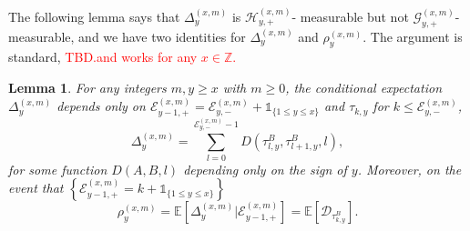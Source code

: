 \documentclass[twoside,12pt,a4paper]{article}
\newtheorem{lemma}{Lemma}[section]
\numberwithin{equation}{section}
\newcommand\TBD{\textcolor{red}{TBD.}}
\newcommand{\edt}[1]{\textcolor{red}{#1}} %
\begin{document}
	The following lemma says that $\Delta^{(x,m)}_{y}$ is $\mathcal{H}_{y, +}^{(x,m)}$- measurable but not $\mathcal{G}_{y, +}^{(x,m)}$- measurable, and we have two identities for $\Delta^{(x,m)}_{y}$ and  $\rho_{y}^{(x,m)}$. The argument is standard, \TBD \edt{and works for any $x\in \mathbb{Z}$.}
	\begin{lemma}\label{lm: identities for Del, rho} 
		For any integers $m,y\geq x$ with $m\geq 0$, the conditional expectation $\Delta^{(x,m)}_{y}$ depends only on $ \mathcal{E}_{y-1,+}^{(x,m)} = \mathcal{E}_{y,-}^{(x,m)} + \mathbb{1}_{ \{ 1\leq y \leq x \} }$  and $ \tau_{k,y}$ for $k\leq \mathcal{E}^{(x,m)}_{y,-} $,
		\begin{equation} \label{eq: cummulated drift at a site}
			\Delta_{y}^{(x,m)} = \sum_{l=0 }^{ \mathcal{E}^{(x,m)}_{y,-} -1  } D\left(\tau^{B}_{l,y},\tau^{B}_{l+1,y},l \right),
		\end{equation}	
		for some function $D(A,B,l)$ depending only on the sign of $y$.
		Moreover, on the event that $\left\{\mathcal{E}^{(x,m)}_{y-1,+}  = k + \mathbb{1}_{\{1\leq y\leq x\}}  \right\}$
		\begin{equation} \label{eq: conditional mean in GPU represenetation}
			\rho_{y}^{(x,m)} = \mathbb{E}\left[ \Delta_{y}^{(x,m)}\vert \mathcal{E}^{(x,m)}_{y-1,+} \right]	  
			= \mathbb{E}\left[  \mathcal{D}_{\tau^{B}_{k,y}} \right].
		\end{equation} 
	\end{lemma}  
\end{document}
